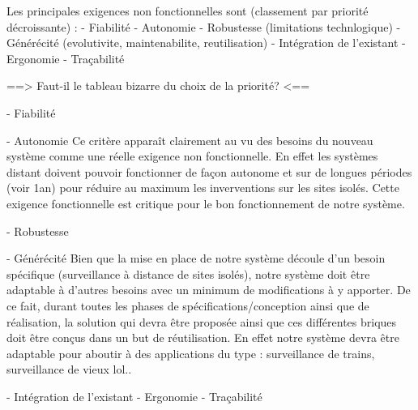 Les principales exigences non fonctionnelles sont (classement par priorité décroissante) : 
- Fiabilité
- Autonomie
- Robustesse (limitations technlogique)
- Générécité (evolutivite, maintenabilite, reutilisation)
- Intégration de l'existant
- Ergonomie
- Traçabilité


==>		Faut-il le tableau bizarre du choix de la priorité?		<==


- Fiabilité

- Autonomie
	Ce critère apparaît clairement au vu des besoins du nouveau système comme une réelle exigence non fonctionnelle.
En effet les systèmes distant doivent pouvoir fonctionner de façon autonome et sur de longues périodes (voir 1an)
pour réduire au maximum les inverventions sur les sites isolés. Cette exigence fonctionnelle est critique pour le bon
fonctionnement de notre système.

- Robustesse

- Générécité
	Bien que la mise en place de notre système découle d'un besoin spécifique (surveillance à distance de sites 
isolés), notre système doit être adaptable à d'autres besoins avec un minimum de modifications à y apporter. De ce 
fait, durant toutes les phases de spécifications/conception ainsi que de réalisation, la solution qui devra être 
proposée ainsi que ces différentes briques doit être conçus dans un but de réutilisation. En effet notre système 
devra être adaptable pour aboutir à des applications du type : surveillance de trains, surveillance de vieux lol..

- Intégration de l'existant
- Ergonomie
- Traçabilité